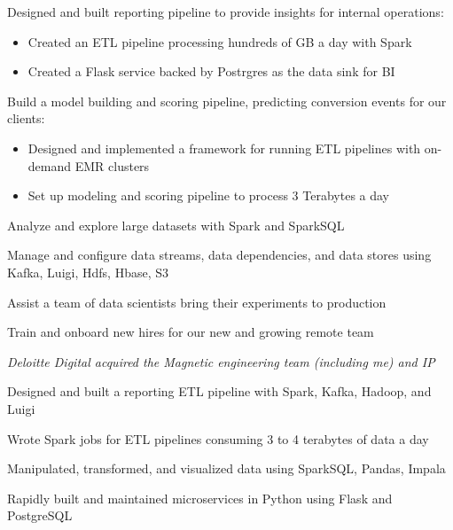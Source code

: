 \documentclass[]{deedy-resume-openfont}
\begin{document}
\vspace{\topsep} %
\begin{tightemize}
\item Designed and built reporting pipeline to provide insights for internal operations:
  \begin{itemize}
  \item Created an ETL pipeline processing hundreds of GB a day with Spark
  \item Created a Flask service backed by Postrgres as the data sink for BI
  \end{itemize}
\item Build a model building and scoring pipeline, predicting conversion events for our clients:
  \begin{itemize}
  \item Designed and implemented a framework for running ETL pipelines with on-demand EMR clusters
  \item Set up modeling and scoring pipeline to process 3 Terabytes a day
  \end{itemize}
\item Analyze and explore large datasets with Spark and SparkSQL
\item Manage and configure data streams, data dependencies, and data stores using Kafka, Luigi, Hdfs, Hbase, S3
\item Assist a team of data scientists bring their experiments to production
\item Train and onboard new hires for our new and growing remote team
\end{tightemize}
\sectionsep

\vspace{\topsep} %
\textit{Deloitte Digital acquired the Magnetic engineering team (including me) and IP}
\vspace{\topsep} %
\begin{tightemize}
\item Designed and built a reporting ETL pipeline with Spark, Kafka, Hadoop, and Luigi
\item Wrote Spark jobs for ETL pipelines consuming 3 to 4 terabytes of data a day
\item Manipulated, transformed, and visualized data using SparkSQL, Pandas, Impala
\item Rapidly built and maintained microservices in Python using Flask and PostgreSQL
\end{tightemize}
\sectionsep
\end{document}

